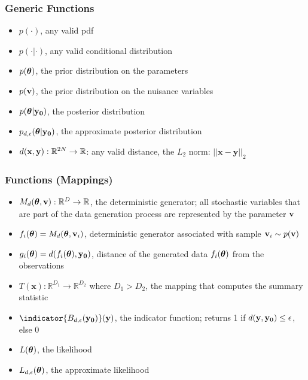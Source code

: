 \subsubsection*{Generic Functions}
\label{sec:generic-functions}

\begin{itemize}
\item $p(\cdot)$, any valid pdf
\item $p(\cdot | \cdot)$, any valid conditional distribution
\item $p(\boldsymbol{\theta})$, the prior distribution on the parameters
\item $p(\mathbf{v})$, the prior distribution on the nuisance variables
\item $p(\boldsymbol{\theta}|\mathbf{y_0})$, the posterior distribution
\item $p_{d,\epsilon}(\boldsymbol{\theta}|\mathbf{y_0})$, the approximate posterior
  distribution  
\item $d(\mathbf{x}, \mathbf{y}): \mathbb{R}^{2N} \rightarrow \mathbb{R}$: any valid
  distance, the $L_2$ norm: $||\mathbf{x}-\mathbf{y}||_2$
\end{itemize}

\subsubsection*{Functions (Mappings)}
\label{sec:functions-mappings}

\begin{itemize}
\item $M_d(\boldsymbol{\theta}, \mathbf{v}): \mathbb{R}^D \rightarrow \mathbb{R}$, the deterministic
  generator; all stochastic variables that are part of the data generation process are represented by the parameter $\mathbf{v}$
\item $f_i(\boldsymbol{\theta}) = M_d(\boldsymbol{\theta}, \mathbf{v}_i)$, deterministic generator associated with sample $\mathbf{v}_i \sim p(\mathbf{v})$
\item $g_i(\boldsymbol{\theta}) = d(f_i(\boldsymbol{\theta}), \mathbf{y_0})$, distance of the generated data $f_i(\boldsymbol{\theta})$ from the observations
\item $T(\mathbf{x}): \mathbb{R}^{D_1} \rightarrow \mathbb{R}^{D_2}$
  where $D_1 > D_2$, the mapping that computes the summary statistic
\item $\indicator{\region(\data)}(\yb)$, the indicator function; returns 1 if $d(\mathbf{y}, \mathbf{y_0}) \leq \epsilon$, else 0
\item $L(\boldsymbol{\theta})$, the likelihood
\item $L_{d,\epsilon}(\boldsymbol{\theta})$, the approximate likelihood
\end{itemize}
